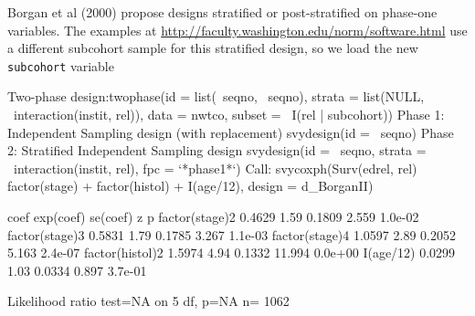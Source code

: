 \documentclass{article}
\begin{document}
Borgan et al (2000) propose designs stratified or post-stratified on
phase-one variables. The examples at
\url{http://faculty.washington.edu/norm/software.html} use a different
subcohort sample for this stratified design, so we load the new
\texttt{subcohort} variable
\begin{Schunk}
\begin{Soutput}
Two-phase design:twophase(id = list(~seqno, ~seqno), strata = list(NULL, ~interaction(instit, 
    rel)), data = nwtco, subset = ~I(rel | subcohort))
Phase 1:
Independent Sampling design (with replacement)
svydesign(id = ~seqno)
Phase 2:
Stratified Independent Sampling design
svydesign(id = ~seqno, strata = ~interaction(instit, rel), fpc = `*phase1*`)
Call:
svycoxph(Surv(edrel, rel) ~ factor(stage) + factor(histol) + 
    I(age/12), design = d_BorganII)


                  coef exp(coef) se(coef)      z       p
factor(stage)2  0.4629      1.59   0.1809  2.559 1.0e-02
factor(stage)3  0.5831      1.79   0.1785  3.267 1.1e-03
factor(stage)4  1.0597      2.89   0.2052  5.163 2.4e-07
factor(histol)2 1.5974      4.94   0.1332 11.994 0.0e+00
I(age/12)       0.0299      1.03   0.0334  0.897 3.7e-01

Likelihood ratio test=NA  on 5 df, p=NA  n= 1062 
\end{Soutput}
\end{Schunk}
\end{document}
